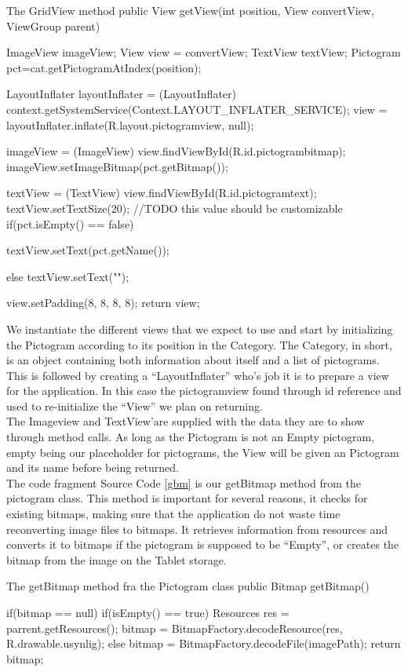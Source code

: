 \begin{source}[{gridviewm}]{The GridView method}
	public View getView(int position, View convertView, ViewGroup parent) 
	{
		ImageView imageView;
		View view = convertView;
		TextView textView;
		Pictogram pct=cat.getPictogramAtIndex(position);

		LayoutInflater layoutInflater = (LayoutInflater) context.getSystemService(Context.LAYOUT_INFLATER_SERVICE);
		view = layoutInflater.inflate(R.layout.pictogramview, null);

		imageView = (ImageView) view.findViewById(R.id.pictogrambitmap); 
		imageView.setImageBitmap(pct.getBitmap());

		textView = (TextView) view.findViewById(R.id.pictogramtext);
		textView.setTextSize(20);	//TODO this value should be customizable
		if(pct.isEmpty() == false)
		{

			textView.setText(pct.getName());
		}
		else
		{
			textView.setText("");
		}

		view.setPadding(8, 8, 8, 8);
		return view;
	}
\end{source}
We instantiate the different views that we expect to use and start by initializing the Pictogram according to its position in the Category.
The Category, in short, is an object containing both information about itself and a list of pictograms.
This is followed by creating a ``LayoutInflater'' who's job it is to prepare a view for the application.
In this case the pictogramview found through id reference and used to re-initialize the ``View'' we plan on returning.\\
The Imageview and TextView'are supplied with the data they are to show through method calls. 
As long as the Pictogram is not an Empty pictogram, empty being our placeholder for pictograms, the View will be given an Pictogram and its name before being returned.\\

The code fragment Source Code \ref{gbm} is our getBitmap method from the pictogram class.
This method is important for several reasons, it checks for existing bitmaps, making sure that the application do not waste time reconverting image files to bitmaps.
It retrieves information from resources and converts it to bitmaps if the pictogram is supposed to be ``Empty'', or creates the bitmap from the image on the Tablet storage.

\begin{source}[{gbm}]{The getBitmap method fra the Pictogram class}
	public Bitmap getBitmap()
	{
		if(bitmap == null)
		{
			if(isEmpty() == true)
			{
				Resources res = parrent.getResources();
				bitmap = BitmapFactory.decodeResource(res, R.drawable.usynlig);
			}
			else
			{
				bitmap = BitmapFactory.decodeFile(imagePath);
			}
		}
		return bitmap;
	
	}
\end{source}


